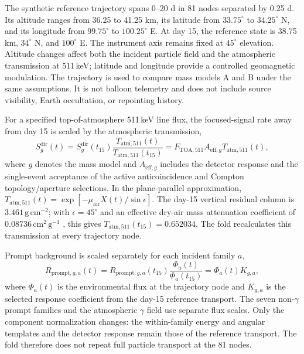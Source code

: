 \documentclass[11pt]{article}
\begin{document}
The synthetic reference trajectory spans 0--20 d in 81 nodes separated by
0.25 d. Its altitude ranges from 36.25 to 41.25 km, its latitude from
$33.75^\circ$ to $34.25^\circ$ N, and its longitude from $99.75^\circ$ to
$100.25^\circ$ E. At day 15, the reference state is 38.75 km,
$34^\circ$ N, and $100^\circ$ E. The instrument axis remains fixed at
$45^\circ$ elevation. Altitude changes affect both the incident
particle field and the atmospheric transmission at 511\,keV; latitude and
longitude provide a controlled geomagnetic modulation. The trajectory is used
to compare mass models A and B under the same assumptions. It is not balloon
telemetry and does not include source visibility, Earth occultation, or
repointing history.

For a specified top-of-atmosphere 511\,keV line flux, the focused-signal rate
away from day 15 is scaled by the atmospheric transmission,
\begin{equation}
 S^{\mathrm{dir}}_g(t)
 =S^{\mathrm{dir}}_g(t_{15})
 \frac{T_{\mathrm{atm},511}(t)}{T_{\mathrm{atm},511}(t_{15})}
 =F_{\mathrm{TOA},511}A_{\mathrm{eff},g}T_{\mathrm{atm},511}(t),
 \label{eq:mission_signal}
\end{equation}
where $g$ denotes the mass model and $A_{\mathrm{eff},g}$ includes the detector
response and the single-event acceptance of the active anticoincidence and
Compton topology/aperture selections. In the plane-parallel approximation,
$T_{\mathrm{atm},511}(t)=\exp[-\mu_{\mathrm{air}}X(t)/\sin\epsilon]$. The
day-15 vertical residual column is $3.461\,\mathrm{g\,cm^{-2}}$; with
$\epsilon=45^\circ$ and an effective dry-air mass attenuation coefficient of
$0.08736\,\mathrm{cm^2\,g^{-1}}$ \cite{NISTXCOM}, this gives
$T_{\mathrm{atm},511}(t_{15})=0.652034$. The fold recalculates this transmission
at every trajectory node.

Prompt background is scaled separately for each incident family $a$,
\begin{equation}
 R_{\mathrm{prompt},g,a}(t)
 =R_{\mathrm{prompt},g,a}(t_{15})
 \frac{\Phi_a(t)}{\Phi_a(t_{15})}
 =\Phi_a(t)K_{g,a},
 \label{eq:prompt_source_response}
\end{equation}
where $\Phi_a(t)$ is the environmental flux at the trajectory node and
$K_{g,a}$ is the selected response coefficient from the day-15 reference
transport. The seven non-$\gamma$ prompt families and the atmospheric
$\gamma$ field use separate flux scales. Only the component normalization
changes: the within-family energy and angular templates and the detector
response remain those of the reference transport. The fold therefore does not
repeat full particle transport at the 81 nodes.
\end{document}
